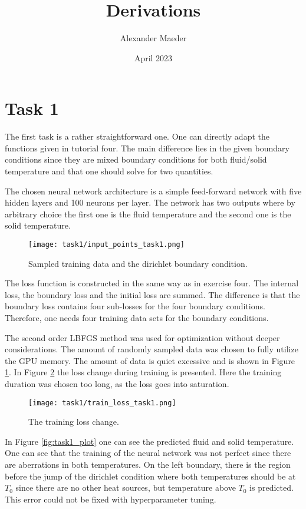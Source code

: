 \documentclass{article}
\title{Derivations}
\author{Alexander Maeder}
\date{April 2023}
\begin{document}
\section{Task 1}
The first task is a rather straightforward one. 
One can directly adapt the functions given in tutorial four.
The main difference lies in the given boundary conditions
since they are mixed boundary conditions for both fluid/solid temperature
and that one should solve for two quantities.

The chosen neural network architecture is a simple feed-forward network with five hidden layers and 100 neurons per layer.
The network has two outputs where by arbitrary choice the first one is the fluid temperature and the second one is the solid temperature.

\begin{figure}[ht!]
\texttt{[image: task1/input\_points\_task1.png]}
\caption{Sampled training data and the dirichlet boundary condition.}
\label{fig:task1_samples}
\end{figure}

The loss function is constructed in the same way as in exercise four.
The internal loss, the boundary loss and the initial loss are summed.
The difference is that the boundary loss contains four sub-losses for the four boundary conditions.
Therefore, one needs four training data sets for the boundary conditions.

The second order LBFGS method was used for optimization without deeper considerations.
The amount of randomly sampled data was chosen to fully utilize the GPU memory.  
The amount of data is quiet excessive and is shown in Figure \ref{fig:task1_samples}.
In Figure \ref{fig:task1_loss} the loss change during training is presented. Here the training duration was chosen too long, as the loss goes into saturation.

\begin{figure}[ht!]
\texttt{[image: task1/train\_loss\_task1.png]}
\caption{The training loss change.}
\label{fig:task1_loss}
\end{figure}

In Figure \ref{fig:task1_plot} one can see the predicted fluid and solid temperature.
One can see that the training of the neural network was not perfect since there are aberrations in both temperatures.
On the left boundary, there is the region before the jump of the dirichlet condition
where both temperatures should be at $T_0$ since there are no other heat sources, but temperature above $T_0$ is predicted.
This error could not be fixed with hyperparameter tuning.
\end{document}

